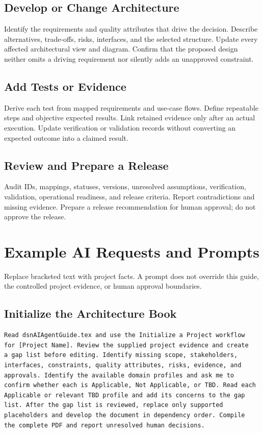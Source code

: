 \subsection{Develop or Change Architecture}
Identify the requirements and quality attributes that drive the decision.
Describe alternatives, trade-offs, risks, interfaces, and the selected
structure. Update every affected architectural view and diagram. Confirm that
the proposed design neither omits a driving requirement nor silently adds an
unapproved constraint.

\subsection{Add Tests or Evidence}
Derive each test from mapped requirements and use-case flows. Define repeatable
steps and objective expected results. Link retained evidence only after an
actual execution. Update verification or validation records without converting
an expected outcome into a claimed result.

\subsection{Review and Prepare a Release}
Audit IDs, mappings, statuses, versions, unresolved assumptions, verification,
validation, operational readiness, and release criteria. Report contradictions
and missing evidence. Prepare a release recommendation for human approval; do
not approve the release.

\section{Example AI Requests and Prompts}
\label{Section:AIExamplePrompts}
Replace bracketed text with project facts. A prompt does not override this
guide, the controlled project evidence, or human approval boundaries.

\subsection{Initialize the Architecture Book}
\begin{verbatim}
Read dsnAIAgentGuide.tex and use the Initialize a Project workflow
for [Project Name]. Review the supplied project evidence and create
a gap list before editing. Identify missing scope, stakeholders,
interfaces, constraints, quality attributes, risks, evidence, and
approvals. Identify the available domain profiles and ask me to
confirm whether each is Applicable, Not Applicable, or TBD. Read each
Applicable or relevant TBD profile and add its concerns to the gap
list. After the gap list is reviewed, replace only supported
placeholders and develop the document in dependency order. Compile
the complete PDF and report unresolved human decisions.
\end{verbatim}

